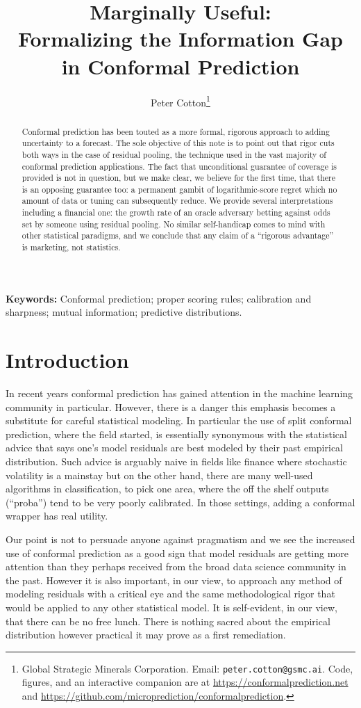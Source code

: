 \documentclass[11pt]{article}
\title{Marginally Useful:\\ Formalizing the Information Gap in Conformal Prediction}
\author{}
\author{Peter Cotton\thanks{Global Strategic Minerals Corporation.
    Email: \texttt{peter.cotton@gsmc.ai}. Code, figures, and an interactive
    companion are at \url{https://conformalprediction.net} and
    \url{https://github.com/microprediction/conformalprediction}.}}
\date{}
\theoremstyle{definition}
\begin{document}
\doublespacing
\maketitle

\begin{abstract}
\noindent
Conformal prediction has been touted as a more formal, rigorous approach to adding
uncertainty to a forecast. The sole objective of this note is to point out that
rigor cuts both ways in the case of residual pooling, the technique used in the 
vast majority of conformal prediction applications. The fact that unconditional 
guarantee of coverage is provided is not in question, but we make clear, we believe for the first
time, that there is an opposing guarantee too: a permanent gambit of logarithmic-score
regret which no amount of data or tuning can subsequently reduce. We provide several 
interpretations including a financial one: the growth rate of an oracle adversary betting
against odds set by someone using residual pooling. No similar self-handicap comes to mind with
other statistical paradigms, and we conclude that any claim of a ``rigorous advantage'' is marketing, not statistics. 
\end{abstract}

\noindent\textbf{Keywords:} Conformal prediction; proper scoring rules; calibration and
sharpness; mutual information; predictive distributions.

\section{Introduction}

In recent years conformal prediction has gained attention in the machine learning community in particular. However, there is
a danger this emphasis becomes a substitute for careful statistical modeling. In particular the use of 
split conformal prediction, where the field started, is essentially synonymous with the statistical advice that says
one's model residuals are best modeled by their past empirical distribution. Such advice is arguably naive in 
fields like finance where stochastic volatility is a mainstay but on the other hand, there are many well-used 
algorithms in classification, to pick one area, where the off the shelf outputs (``proba'') tend to be very poorly calibrated. In those 
settings, adding a conformal wrapper has real utility. 

Our point is not to persuade anyone against pragmatism and we see the increased use of conformal prediction as a good sign that 
model residuals are getting more attention than they perhaps received from the broad data science community in the past. However it is
also important, in our view, to approach any method of modeling residuals with a critical eye and the same methodological rigor that would
be applied to any other statistical model. It is self-evident, in our view, that there can be no free lunch. There is nothing sacred about the 
empirical distribution however practical it may prove as a first remediation.
\end{document}
